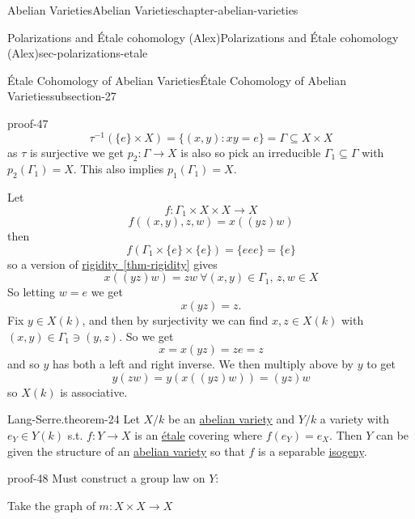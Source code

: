 \documentclass[oneside,10pt,]{book}
\numberwithin{equation}{section}
\begin{document}
\begin{chapterptx}{Abelian Varieties}{}{Abelian Varieties}{}{}{chapter-abelian-varieties}
\begin{sectionptx}{Polarizations and Étale cohomology (Alex)}{}{Polarizations and Étale cohomology (Alex)}{}{}{sec-polarizations-etale}
\begin{subsectionptx}{Étale Cohomology of Abelian Varieties}{}{Étale Cohomology of Abelian Varieties}{}{}{subsection-27}
\begin{proofptx}{}{proof-47}
\begin{equation*}
\tau^{-1}(\{e\} \times X) =  \{(x,y) : xy = e\} = \Gamma \subseteq X\times X
\end{equation*}
as \(\tau \) is surjective we get \(p_2 \colon \Gamma \to X\) is also so pick an irreducible \(\Gamma_1 \subseteq \Gamma\) with \(p_2(\Gamma_1) = X\). This also implies \(p_1(\Gamma_1) = X\).%
\par
\hypertarget{p-289}{}%
Let%
\begin{equation*}
f\colon \Gamma_1 \times X\times X \to X
\end{equation*}
%
\begin{equation*}
f((x,y),z,w) = x((yz)w)
\end{equation*}
then%
\begin{equation*}
f(\Gamma_1 \times\{e\}\times\{e\}) = \{eee\} = \{e\}
\end{equation*}
so a version of \hyperref[thm-rigidity]{rigidity~\ref{thm-rigidity}} gives%
\begin{equation*}
x((yz)w) = zw\ \forall (x,y) \in \Gamma_1,\,z,w\in X
\end{equation*}
So letting \(w = e\) we get%
\begin{equation*}
x(yz) = z\text{.}
\end{equation*}
Fix \(y \in X(k)\), and then by surjectivity we can find \(x,z \in X(k)\) with \((x,y)\in \Gamma_1 \ni (y,z)\). So we get%
\begin{equation*}
x = x(yz) = ze = z
\end{equation*}
and so \(y\) has both a left and right inverse. We then multiply above by \(y\) to get%
\begin{equation*}
y(zw) = y(x((yz)w)) = (yz)w
\end{equation*}
so \(X(k)\) is associative.%
\end{proofptx}
\begin{theorem}{Lang-Serre.}{}{theorem-24}%
\hypertarget{p-290}{}%
Let \(X/k\) be an \hyperref[def-buntes-abvar]{abelian variety} and \(Y/k\) a variety with \(e_Y\in Y(k)\) s.t. \(f\colon Y \to X\) is an \hyperref[def-etale]{étale} covering where \(f(e_Y) = e_X\). Then \(Y\) can be given the structure of an \hyperref[def-buntes-abvar]{abelian variety} so that \(f\) is a separable \hyperref[def-supersing-isog-isog]{isogeny}.%
\end{theorem}
\begin{proofptx}{}{proof-48}
\hypertarget{p-291}{}%
Must construct a group law on \(Y\):%
\par
\hypertarget{p-292}{}%
Take the graph of \(m\colon X\times X \to X\)%

\end{proofptx}
\end{subsectionptx}
\end{sectionptx}
\end{chapterptx}
\end{document}
